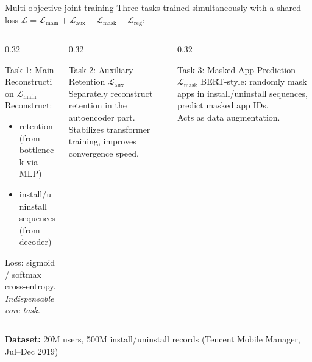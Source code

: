 \documentclass[aspectratio=169,t]{beamer}
\begin{document}
\begin{frame}{Multi-objective joint training}
  Three tasks trained simultaneously with a shared loss $\mathcal{L} = \mathcal{L}_\text{main} + \mathcal{L}_\text{aux} + \mathcal{L}_\text{mask} + \mathcal{L}_\text{reg}$:
  \vspace{0.2cm}
  \begin{columns}[T]
    \begin{column}{0.32\textwidth}
      \begin{block}{Task 1: Main Reconstruction $\mathcal{L}_\text{main}$}
        Reconstruct:
        \begin{itemize}
          \item retention (from bottleneck via MLP)
          \item install/uninstall sequences (from decoder)
        \end{itemize}
        Loss: sigmoid / softmax cross-entropy.\\[0.1cm]
        \emph{Indispensable core task.}
      \end{block}
    \end{column}
    \begin{column}{0.32\textwidth}
      \begin{block}{Task 2: Auxiliary Retention $\mathcal{L}_\text{aux}$}
        Separately reconstruct retention in the autoencoder part.\\[0.3cm]
        Stabilizes transformer training, improves convergence speed.
      \end{block}
    \end{column}
    \begin{column}{0.32\textwidth}
      \begin{block}{Task 3: Masked App Prediction $\mathcal{L}_\text{mask}$}
        BERT-style: randomly mask apps in install/uninstall sequences, predict masked app IDs.\\[0.1cm]
        Acts as data augmentation.
      \end{block}
    \end{column}
  \end{columns}
  \vspace{0.3cm}
  \begin{center}
    \textbf{Dataset:} 20M users, 500M install/uninstall records (Tencent Mobile Manager, Jul–Dec 2019)
  \end{center}
\end{frame}
\end{document}
